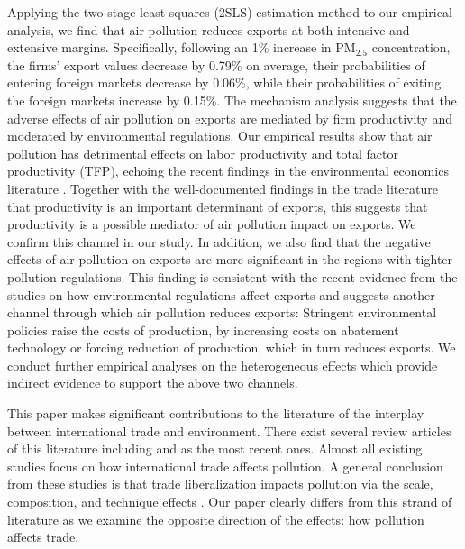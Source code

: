 \documentclass[12pt]{article}
\begin{document}
Applying the two-stage least squares (2SLS) estimation method to our empirical analysis,
we find that air
pollution reduces exports at both intensive and extensive margins.
Specifically, following an 1\% increase in $\mathrm{PM_{2.5}}$ concentration,
the firms' export values decrease by 0.79\% on average, their
probabilities of entering foreign markets decrease by 0.06\%,
while their probabilities of exiting the foreign markets increase by
0.15\%. 
The mechanism analysis suggests that the adverse effects of air pollution on exports are mediated by firm productivity and moderated by environmental regulations. Our empirical results show
that air pollution has detrimental
effects on labor productivity and total factor productivity (TFP), echoing
the recent findings in the environmental economics literature %
\citep{NBERw18392,fu2021air,NBERw28401}. Together with the well-documented findings in the
trade literature  that productivity is an important determinant of exports,
this suggests that productivity is a possible mediator of air
pollution impact on exports. We confirm this channel in our study. In
addition, we also find that the negative effects of air pollution on exports
are more significant in the regions with tighter pollution regulations. This finding is consistent with the recent evidence from the
studies on how environmental regulations affect exports \citep[e.g.,][]{
cherniwchan2022environmental} and suggests another channel through which air
pollution reduces exports: Stringent environmental policies raise the costs
of production, by increasing costs on abatement technology or forcing
reduction of production, which in turn reduces exports. We conduct further
empirical analyses on the heterogeneous effects which provide indirect
evidence to support the above two channels.

This paper makes significant contributions to the literature of the interplay between
international trade and environment. There exist several review articles of
this literature including \cite{cherniwchan2017trade} and \cite{NBERw30020}
as the most recent ones. Almost all existing studies focus on how
international trade affects pollution. A general conclusion from these
studies is that trade liberalization impacts pollution via the scale,
composition, and technique effects \citep{NBERw3914,copeland1994north}. Our
paper clearly differs from this strand of literature as we examine the
opposite direction of the effects: how pollution affects trade.
\end{document}
